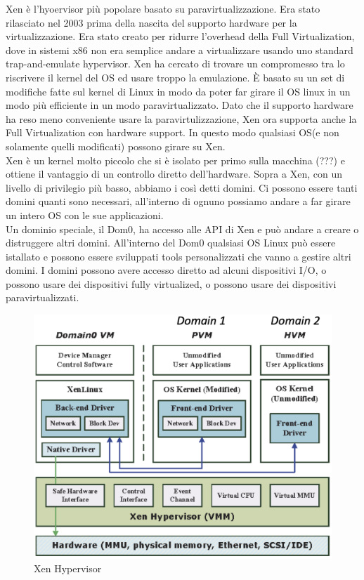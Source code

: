 \documentclass{article}
\begin{document}
Xen è l'hyoervisor più popolare basato su paravirtualizzazione. Era stato rilasciato nel 2003 prima della nascita del supporto hardware per la virtualizzazione. Era stato creato per ridurre l'overhead della Full Virtualization, dove in sistemi x86 non era semplice andare a virtualizzare usando uno standard trap-and-emulate hypervisor. Xen ha cercato di trovare un compromesso tra lo riscrivere il kernel del OS ed usare troppo la emulazione. È basato su un set di modifiche fatte sul kernel di Linux in modo da poter far girare il OS linux in un modo più efficiente in un modo paravirtualizzato. Dato che il supporto hardware ha reso meno conveniente usare la paravirtulizzazione, Xen ora supporta anche la Full Virtualization con hardware support. In questo modo qualsiasi OS(e non solamente quelli modificati) possono girare su Xen.\\
Xen è un kernel molto piccolo che si è isolato per primo sulla macchina (???) e ottiene il vantaggio di un controllo diretto dell'hardware. Sopra a Xen, con un livello di privilegio più basso, abbiamo i così detti domini. Ci possono essere tanti domini quanti sono necessari, all'interno di ognuno possiamo andare a far girare un intero OS con le sue applicazioni.\\
Un dominio speciale, il Dom0, ha accesso alle API di Xen e può andare a creare o distruggere altri domini. All'interno del Dom0 qualsiasi OS Linux può essere istallato e possono essere sviluppati tools personalizzati che vanno a gestire altri domini. I domini possono avere accesso diretto ad alcuni dispositivi I/O, o possono usare dei dispositivi fully virtualized, o possono usare dei dispositivi paravirtualizzati.
\begin{figure}[H]
\centering
\includegraphics[scale=0.5]{img/Virt_tech/19.png}
\caption{Xen Hypervisor}
\end{figure}
\end{document}

